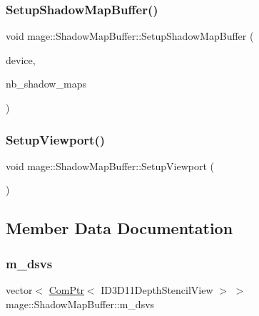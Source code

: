 \subsubsection{\texorpdfstring{Setup\+Shadow\+Map\+Buffer()}{SetupShadowMapBuffer()}}
{\footnotesize\ttfamily void mage\+::\+Shadow\+Map\+Buffer\+::\+Setup\+Shadow\+Map\+Buffer (\begin{DoxyParamCaption}\item[{I\+D3\+D11\+Device2 $\ast$}]{device,  }\item[{size\+\_\+t}]{nb\+\_\+shadow\+\_\+maps }\end{DoxyParamCaption})\hspace{0.3cm}{\ttfamily [private]}}

\hypertarget{structmage_1_1_shadow_map_buffer_aacabad92fb9c0bf81cf2f3c1fbae9f13}{}\label{structmage_1_1_shadow_map_buffer_aacabad92fb9c0bf81cf2f3c1fbae9f13} 
\subsubsection{\texorpdfstring{Setup\+Viewport()}{SetupViewport()}}
{\footnotesize\ttfamily void mage\+::\+Shadow\+Map\+Buffer\+::\+Setup\+Viewport (\begin{DoxyParamCaption}{ }\end{DoxyParamCaption})\hspace{0.3cm}{\ttfamily [private]}}



\subsection{Member Data Documentation}
\hypertarget{structmage_1_1_shadow_map_buffer_acea16328aa086a093ad3f2ef54eb5f4a}{}\label{structmage_1_1_shadow_map_buffer_acea16328aa086a093ad3f2ef54eb5f4a} 
\subsubsection{\texorpdfstring{m\+\_\+dsvs}{m\_dsvs}}
{\footnotesize\ttfamily vector$<$ \hyperlink{namespacemage_ae74f374780900893caa5555d1031fd79}{Com\+Ptr}$<$ I\+D3\+D11\+Depth\+Stencil\+View $>$ $>$ mage\+::\+Shadow\+Map\+Buffer\+::m\+\_\+dsvs\hspace{0.3cm}{\ttfamily [private]}}

